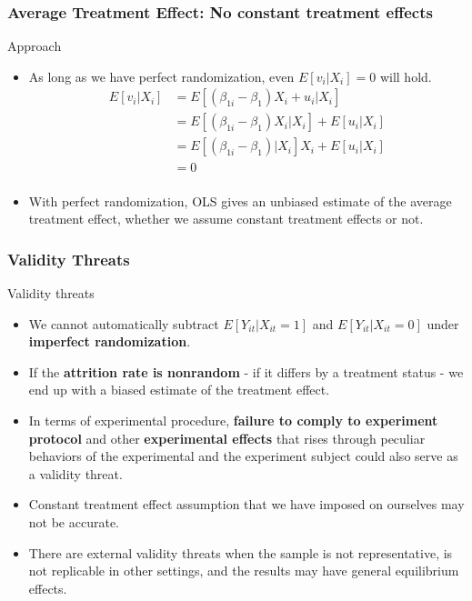 \documentclass[compress]{beamer}
\begin{document}
\begin{frame}
\frametitle{Average Treatment Effect: No constant treatment effects}
Approach
\begin{itemize}
\item As long as we have perfect randomization, even $E[v_i|X_i]=0$ will hold. 
\[
\begin{aligned}
E[v_i|X_i]&=E[(\beta_{1i}-\beta_1)X_i+u_i|X_i]\\
&=E[(\beta_{1i}-\beta_1)X_i|X_i]+E[u_i|X_i]\\
&=E[(\beta_{1i}-\beta_1)|X_i]X_i+E[u_i|X_i]\\
&=0\\
\end{aligned}
\]
\item With perfect randomization, OLS gives an unbiased estimate of the average treatment effect, whether we assume constant treatment effects or not. 
\end{itemize}
\end{frame}

\begin{frame}
\frametitle{Validity Threats}
Validity threats
\begin{itemize}
\item We cannot automatically subtract $E[Y_{it}|X_{it}=1]$ and $E[Y_{it}|X_{it}=0]$ under \textbf{imperfect randomization}. 
\item If the \textbf{attrition rate is nonrandom} - if it differs by a treatment status - we end up with a biased estimate of the treatment effect. 
\item In terms of experimental procedure, \textbf{failure to comply to experiment protocol} and other \textbf{experimental effects} that rises through peculiar behaviors of the experimental and the experiment subject could also serve as a validity threat. 
\item  Constant treatment effect assumption that we have imposed on ourselves may not be accurate. 
\item There are external validity threats when the sample is not representative, is not replicable in other settings, and the results may have general equilibrium effects.
\end{itemize}
\end{frame}
\end{document}
